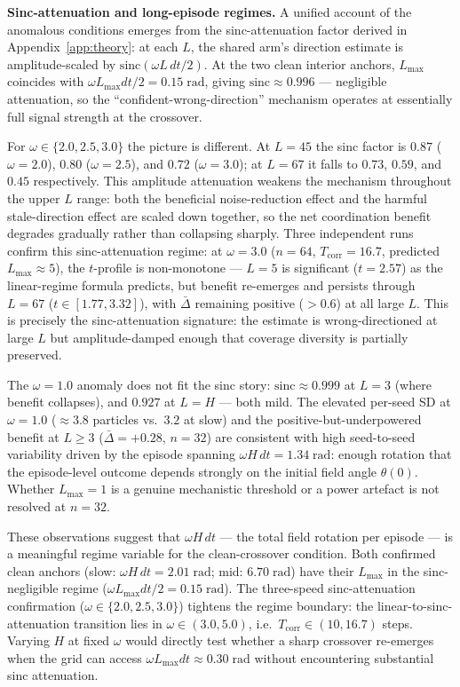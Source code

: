 \documentclass[sigconf,anonymous]{aamas}
\newcommand{\Dbar}{\bar{\Delta}}
\newcommand{\Lmax}{L_{\max}}
\newcommand{\Tcorr}{T_{\mathrm{corr}}}
\begin{document}
\medskip
\noindent\textbf{Sinc-attenuation and long-episode regimes.}
A unified account of the anomalous conditions emerges from the
sinc-attenuation factor derived in Appendix~\ref{app:theory}:
at each $L$, the shared arm's direction estimate is amplitude-scaled
by $\mathrm{sinc}(\omega L\,dt/2)$.
At the two clean interior anchors, $\Lmax$ coincides with
$\omega\Lmax dt/2 = 0.15\;\text{rad}$, giving
$\mathrm{sinc} \approx 0.996$ — negligible attenuation,
so the ``confident-wrong-direction'' mechanism operates at
essentially full signal strength at the crossover.

For $\omega{\in}\{2.0, 2.5, 3.0\}$ the picture is different.
At $L{=}45$ the sinc factor is $0.87$ ($\omega{=}2.0$),
$0.80$ ($\omega{=}2.5$), and $0.72$ ($\omega{=}3.0$);
at $L{=}67$ it falls to $0.73$, $0.59$, and $0.45$ respectively.
This amplitude attenuation weakens the mechanism throughout
the upper $L$ range: both the beneficial noise-reduction effect
and the harmful stale-direction effect are scaled down together,
so the net coordination benefit degrades gradually rather than
collapsing sharply.
Three independent runs confirm this sinc-attenuation regime:
at $\omega{=}3.0$ ($n{=}64$, $\Tcorr{=}16.7$, predicted
$\Lmax{\approx}5$), the $t$-profile is non-monotone —
$L{=}5$ is significant ($t{=}2.57$) as the linear-regime formula
predicts, but benefit re-emerges and persists through $L{=}67$
($t{\in}[1.77, 3.32]$), with $\Dbar$ remaining positive
($> 0.6$) at all large $L$.  This is precisely the sinc-attenuation
signature: the estimate is wrong-directioned at large $L$ but
amplitude-damped enough that coverage diversity is partially
preserved.

The $\omega{=}1.0$ anomaly does not fit the sinc story:
$\mathrm{sinc} \approx 0.999$ at $L{=}3$ (where benefit collapses),
and $0.927$ at $L{=}H$ — both mild.
The elevated per-seed SD at $\omega{=}1.0$
(${\approx}3.8$ particles vs.\ $3.2$ at slow) and the
positive-but-underpowered benefit at $L{\geq}3$ ($\Dbar{=}{+}0.28$,
$n{=}32$) are consistent with high seed-to-seed variability driven by
the episode spanning $\omega H\,dt{=}1.34\;\text{rad}$: enough
rotation that the episode-level outcome depends strongly on the
initial field angle $\theta(0)$.  Whether $\Lmax{=}1$ is a genuine
mechanistic threshold or a power artefact is not resolved at $n{=}32$.

These observations suggest that $\omega H\,dt$ — the total field
rotation per episode — is a meaningful regime variable for the
clean-crossover condition.
Both confirmed clean anchors (slow: $\omega H\,dt{=}2.01\;\text{rad}$;
mid: $6.70\;\text{rad}$) have their $\Lmax$ in the
sinc-negligible regime ($\omega\Lmax dt/2 = 0.15\;\text{rad}$).
The three-speed sinc-attenuation confirmation ($\omega{\in}\{2.0, 2.5, 3.0\}$)
tightens the regime boundary: the linear-to-sinc-attenuation transition
lies in $\omega{\in}(3.0, 5.0)$, i.e.\ $\Tcorr{\in}(10, 16.7)$ steps.
Varying $H$ at fixed $\omega$ would directly test whether a
sharp crossover re-emerges when the grid can access
$\omega\Lmax dt \approx 0.30\;\text{rad}$
without encountering substantial sinc attenuation.
\end{document}
